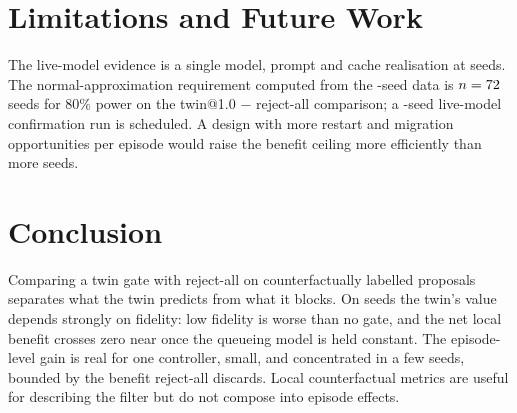\documentclass[conference]{IEEEtran}
\begin{document}
\section{Limitations and Future Work}
The live-model evidence is a single model, prompt and cache realisation at \LLMSeeds{} seeds. The normal-approximation requirement computed from the \LLMSeeds-seed data is $n=72$ seeds for 80\% power on the twin@1.0 $-$ reject-all comparison; a \LLMTwinTenNeed-seed live-model confirmation run is scheduled. A design with more restart and migration opportunities per episode would raise the benefit ceiling more efficiently than more seeds.

\section{Conclusion}
Comparing a twin gate with reject-all on counterfactually labelled proposals separates what the twin predicts from what it blocks. On \NSeeds{} seeds the twin's value depends strongly on fidelity: low fidelity is worse than no gate, and the net local benefit crosses zero near \ScrCrossII{} once the queueing model is held constant. The episode-level gain is real for one controller, small, and concentrated in a few seeds, bounded by the benefit reject-all discards. Local counterfactual metrics are useful for describing the filter but do not compose into episode effects.



\end{document}
